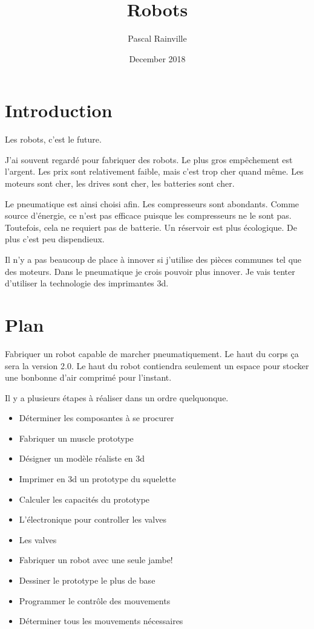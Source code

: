 \documentclass{article}
\title{Robots}
\author{Pascal Rainville }
\date{December 2018}
\begin{document}
\maketitle

\section{Introduction}
Les robots, c'est le future.

J'ai souvent regardé pour fabriquer des robots. Le plus gros empêchement est l'argent. Les prix sont relativement faible, mais c'est trop cher quand même. Les moteurs sont cher, les drives sont cher, les batteries sont cher.

Le pneumatique est ainsi choisi afin. Les compresseurs sont abondants. Comme source d'énergie, ce n'est pas efficace puisque les compresseurs ne le sont pas. Toutefois, cela ne requiert pas de batterie. Un réservoir est plus écologique. De plus c'est peu dispendieux.

Il n'y a pas beaucoup de place à innover si j'utilise des pièces communes tel que des moteurs. Dans le pneumatique je crois pouvoir plus innover. Je vais tenter d'utiliser la technologie des imprimantes 3d.


\section{Plan}

Fabriquer un robot capable de marcher pneumatiquement. Le haut du corps ça sera la version 2.0. Le haut du robot contiendra seulement un espace pour stocker une bonbonne d'air comprimé pour l'instant.

Il y a plusieurs étapes à réaliser dans un ordre quelquonque.
\begin{itemize}
    \item Déterminer les composantes à se procurer
    \item Fabriquer un muscle prototype
    \item Désigner un modèle réaliste en 3d
    \item Imprimer en 3d un prototype du squelette
    \item Calculer les capacités du prototype
    \item L'électronique pour controller les valves
    \item Les valves
    \item Fabriquer un robot avec une seule jambe!
    \item Dessiner le prototype le plus de base
    \item Programmer le contrôle des mouvements
    \item Déterminer tous les mouvements nécessaires
\end{itemize}
\end{document}
